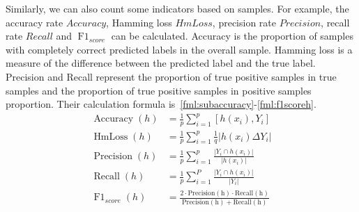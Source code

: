 Similarly, we can also count some indicators based on samples. For example, the accuracy rate \(Accuracy\), Hamming loss \(HmLoss\), precision rate \(Precision\), recall rate \(Recall\) and \(\operatorname{F1}_{score}\) can be calculated. Accuracy is the proportion of samples with completely correct predicted labels in the overall sample. Hamming loss is a measure of the difference between the predicted label and the true label. Precision and Recall represent the proportion of true positive samples in true samples and the proportion of true positive samples in positive samples proportion. Their calculation formula is~\ref{fml:subaccuracy}-\ref{fml:f1scoreh}.
\begin{align}
	\operatorname{Accuracy}(h)   & =\frac{1}{p} \sum_{i=1}^{p}[{h}(x_{i}), Y_{i}] \label{fml:subaccuracy}                                                                                  \\
	\operatorname{HmLoss}(h)     & =\frac{1}{p} \sum_{i=1}^{p} \frac{1}{q}|h(x_{i}) \Delta Y_{i}| \label{fml:hmloss}                                                                       \\
	\operatorname{Precision}(h)  & =\frac{1}{p} \sum_{i=1}^{p} \frac{|Y_{i} \cap h(x_{i})|}{|h(x_{i})|} \label{fml:Precisionh}                                                             \\
	\operatorname{Recall}(h)     & =\frac{1}{p} \sum_{i=1}^{P} \frac{|Y_{i} \cap h(x_{i})|}{|Y_{i}|}    \label{fml:Recallh}                                                                \\
	\operatorname{F1}_{score}(h) & =\frac{2 \cdot \operatorname{Precision(h)} \cdot \operatorname {Recall(h)}}{\operatorname {Precision(h)}+\operatorname{Recall(h)}} \label{fml:f1scoreh}
\end{align}



